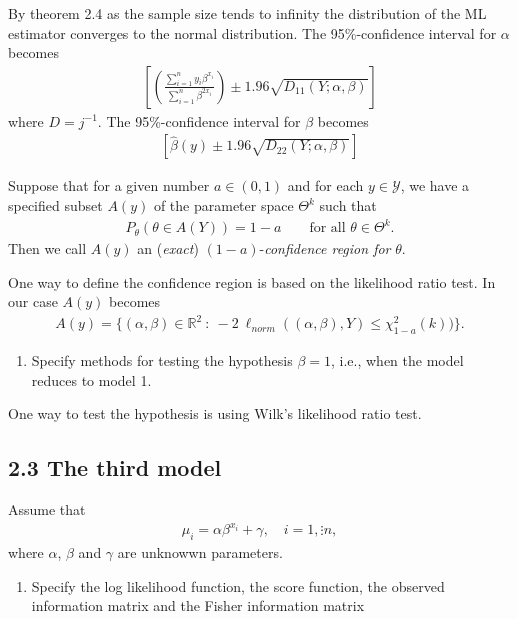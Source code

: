 By theorem 2.4 as the sample size tends to infinity the distribution of the ML estimator converges to the normal distribution.
The 95\%-confidence interval for $\alpha$ becomes
\begin{align*}
    \left[ \left( \frac{\sum_{i=1}^n y_i \beta^{x_i}}{\sum_{i=1}^n \beta^{2x_i}}\right) \pm 1.96 \sqrt{D_{11}(Y; \alpha, \beta)} \right]
\end{align*}
where $D = j^{-1}$.
The 95\%-confidence interval for $\beta$ becomes
\begin{align*}
    \left[ \hat{\beta}(y) \pm 1.96 \sqrt{D_{22}(Y; \alpha, \beta)} \right]
\end{align*}
\begin{definition}
Suppose that for a given number $a \in (0,1)$ and for each $y \in \mathcal{Y}$, we have a specified subset $A(y)$ of the parameter space $\Theta^k$ such that
\begin{align*}
    P_\theta(\theta \in A(Y)) = 1 - a \qquad \text{for all } \theta \in \Theta^k.
\end{align*}
Then we call $A(y)$ an (\textit{exact}) $(1 - a)$-\textit{confidence region for} $\theta$.
\end{definition}
One way to define the confidence region is based on the likelihood ratio test.
In our case $A(y)$ becomes
\begin{align*}
    A(y) = \{ (\alpha, \beta) \in \mathbb{R}^2 \ : \ -2 \: \ell_{norm}((\alpha, \beta), Y) \leq \chi^2_{1 - a}(k))\}.
\end{align*}

\begin{enumerate}[resume]
    \item Specify methods for testing the hypothesis $\beta = 1$, i.e., when the model reduces to model 1.
\end{enumerate}
One way to test the hypothesis is using Wilk's likelihood ratio test.

\subsection*{2.3 The third model}
Assume that
\begin{align*}
    \mu_i=\alpha \beta^{x_i}+\gamma, \quad i=1,\vdots n,
\end{align*}
where $\alpha$, $\beta$ and $\gamma$ are unknowwn parameters.
\begin{enumerate}
    \item Specify the log likelihood function, the score function, the observed information matrix and the Fisher information matrix
\end{enumerate}

